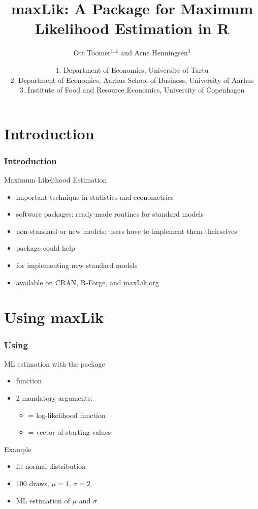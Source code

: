 \documentclass{beamer}
\title[maxLik: Maximum Likelihood in \R]{
   maxLik: A Package for Maximum Likelihood Estimation in \textsf{R}}
\author[Arne Henningsen]{Ott Toomet$^{1,2}$ and Arne Henningsen$^3$}
\date{\footnotesize{
1. Department of Economics, University of Tartu\\
2. Department of Economics, Aarhus School of Business, University of Aarhus\\
3. Institute of Food and Resource Economics, University of Copenhagen}}
\begin{document}
\begin{frame}[plain]
\setlength{\textwidth}{1.15\textwidth}
\titlepage
\end{frame}

\section{Introduction}
\begin{frame}
\frametitle{Introduction}
Maximum Likelihood Estimation
\begin{itemize}
\item important technique in statistics and econometrics
\item software packages: ready-made routines for standard models
\item non-standard or new models: users have to implement them theirselves
\item {} package could help
\item {} for implementing new standard models
\item {} available on CRAN, R-Forge, and \url{maxLik.org}
\end{itemize}
\end{frame}

\section{Using maxLik}
\begin{frame}
\frametitle{Using }
ML estimation with the  package
\begin{itemize}
\item function 
\item 2 mandatory arguments:
   \begin{itemize}
   \item {} = log-likelihood function
   \item {} = vector of starting values
   \end{itemize}
\end{itemize}
\vspace*{2ex}
Example
\begin{itemize}
\item fit normal distribution
\item 100 draws, $\mu = 1$, $\sigma = 2$\\
\item ML estimation of $\mu$ and $\sigma$
\end{itemize}
\end{frame}
\end{document}
